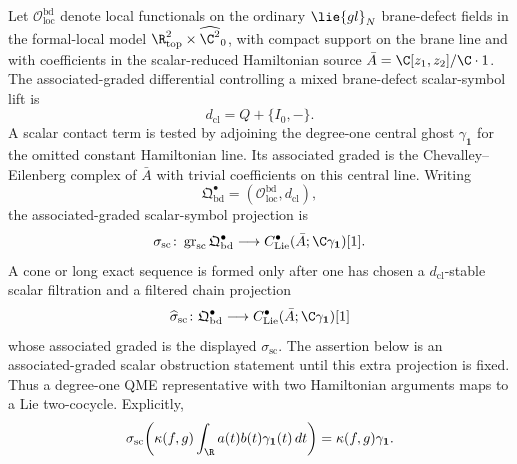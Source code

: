 \begin{defn}
\label{def:app-scalar-obstruction-complex}
  Let \(\mathcal O_{\mathrm{loc}}^{\mathrm{bd}}\) denote local
  functionals on the ordinary \(\lie{gl}_N\) brane-defect fields in the
  formal-local model
  \(\R^2_{\mathrm{top}}\times\widehat{\C^2}_0\), with compact support on
  the brane line and with coefficients in the scalar-reduced Hamiltonian
  source \(\bar A=\C[z_1,z_2]/\C\cdot1\).
  The associated-graded differential controlling a mixed brane-defect
  scalar-symbol lift is
  \[
    d_{\mathrm{cl}}=Q+\{I_0,-\}.
  \]
  A scalar contact term is tested by adjoining the degree-one central
  ghost \(\gamma_{\mathbf 1}\) for the omitted constant Hamiltonian
  line.  Its associated graded is the Chevalley--Eilenberg complex of
  \(\bar A\) with trivial coefficients on this central line.
  Writing
  \[
    \mathfrak Q^\bullet_{\mathrm{bd}}
      =(\mathcal O_{\mathrm{loc}}^{\mathrm{bd}},d_{\mathrm{cl}}),
  \]
  the associated-graded scalar-symbol projection is
  \[
    \sigma_{\mathrm{sc}}\colon
    \operatorname{gr}_{\mathrm{sc}}\mathfrak Q^\bullet_{\mathrm{bd}}
    \longrightarrow
    C^\bullet_{\mathrm{Lie}}(\bar A;\C\gamma_{\mathbf 1})[1].
  \]
  A cone or long exact sequence is formed only after one has chosen a
  \(d_{\mathrm{cl}}\)-stable scalar filtration and a filtered
  chain projection
  \[
    \widehat\sigma_{\mathrm{sc}}\colon
    \mathfrak Q^\bullet_{\mathrm{bd}}
    \longrightarrow
    C^\bullet_{\mathrm{Lie}}(\bar A;\C\gamma_{\mathbf 1})[1]
  \]
  whose associated graded is the displayed \(\sigma_{\mathrm{sc}}\).
  The assertion below is an associated-graded scalar obstruction statement
  until this extra projection is fixed.
  Thus a degree-one QME representative with two Hamiltonian arguments maps to
  a Lie two-cocycle.  Explicitly,
  \[
    \sigma_{\mathrm{sc}}\!\left(
    \kappa(f,g)\int_\R a(t)b(t)\gamma_{\mathbf 1}(t)\,dt\right)
    =
    \kappa(f,g)\gamma_{\mathbf 1}.
  \]
\end{defn}

